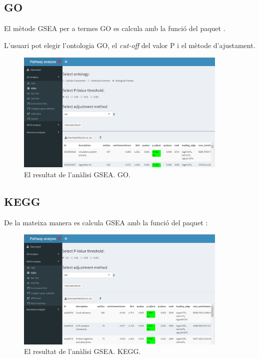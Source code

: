 \subsection{GO}
El mètode GSEA per a termes GO es calcula amb la funció  del paquet . 

L'usuari pot elegir l'ontologia GO, el \textit{cut-off} del valor P i el mètode d'ajustament.
\begin{figure}[H]
\centering
\includegraphics[width=0.9\textwidth]{figures/App_F11_Items_GO_GSEA.png} 
\caption{El resultat de l'anàlisi GSEA. GO.}
\end{figure}


\subsection{KEGG}
De la mateixa manera es calcula GSEA amb la funció  del paquet :

\begin{figure}[H]
\centering
\includegraphics[width=0.9\textwidth]{figures/App_F12_Items_KEGG_GSEA.png} 
\caption{El resultat de l'anàlisi GSEA. KEGG.}
\end{figure}

